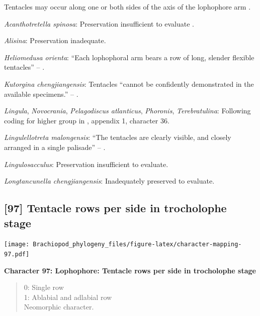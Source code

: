 \documentclass[openany]{book}
\theoremstyle{definition}
\theoremstyle{definition}
\theoremstyle{definition}
\theoremstyle{remark}
\begin{document}
Tentacles may occur along one or both sides of the axis of the
lophophore arm \citep{Carlson1995Phylogeneticrelationships}.

\hypertarget{Acanthotretella_spinosa-coding-96}{}
\emph{Acanthotretella spinosa}: Preservation insufficient to evaluate
\citep{Holmer2006Aspinose}.

\hypertarget{Alisina-coding-96}{}
\emph{Alisina}: Preservation inadequate.

\hypertarget{Heliomedusa_orienta-coding-96}{}
\emph{Heliomedusa orienta}: ``Each lophophoral arm bears a row of long,
slender flexible tentacles'' -- \citet{Zhang2009Architectureand}.

\hypertarget{Kutorgina_chengjiangensis-coding-96}{}
\emph{Kutorgina chengjiangensis}: Tentacles ``cannot be confidently
demonstrated in the available specimens.'' --
\citet{Zhang2007Rhynchonelliformeanbrachiopods}.

\hypertarget{Lingula-coding-96}{}
\emph{Lingula}, \emph{Novocrania}, \emph{Pelagodiscus atlanticus},
\emph{Phoronis}, \emph{Terebratulina}: Following coding for higher group
in \citet{Carlson1995Phylogeneticrelationships}, appendix 1, character
36.

\hypertarget{Lingulellotreta_malongensis-coding-96}{}
\emph{Lingulellotreta malongensis}: ``The tentacles are clearly visible,
and closely arranged in a single palisade'' -- \citet{Zhang2004Newdata}.

\hypertarget{Lingulosacculus-coding-96}{}
\emph{Lingulosacculus}: Preservation insufficient to evaluate.

\hypertarget{Longtancunella_chengjiangensis-coding-96}{}
\emph{Longtancunella chengjiangensis}: Inadequately preserved to
evaluate.

\subsection*{{[}97{]} Tentacle rows per side in trocholophe
stage}\label{tentacle-rows-per-side-in-trocholophe-stage}

\texttt{[image: Brachiopod\_phylogeny\_files/figure-latex/character-mapping-97.pdf]}

\textbf{Character 97: Lophophore: Tentacle rows per side in trocholophe
stage}

\begin{quote}
0: Single row\\
1: Ablabial and adlabial row\\
Neomorphic character.
\end{quote}
\end{document}

